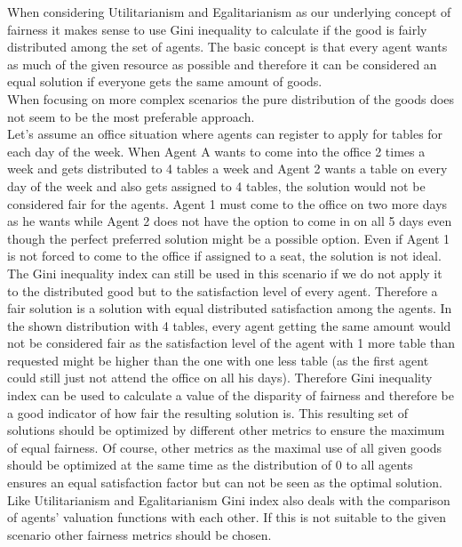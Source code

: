 \documentclass[german, a4paper, 11pt, oneside]{scrbook}
\begin{document}
When considering Utilitarianism and Egalitarianism as our underlying concept of fairness it makes sense to use Gini inequality to calculate if the good is fairly distributed among the set of agents. The basic concept is that every agent wants as much of the given resource as possible and therefore it can be considered an equal solution if everyone gets the same amount of goods. \\When focusing on more complex scenarios the pure distribution of the goods does not seem to be the most preferable approach. \\ Let's assume an office situation where agents can register to apply for tables for each day of the week. When Agent A wants to come into the office 2 times a week and gets distributed to 4 tables a week and Agent 2 wants a table on every day of the week and also gets assigned to 4 tables, the solution would not be considered fair for the agents. Agent 1 must come to the office on two more days as he wants while Agent 2 does not have the option to come in on all 5 days even though the perfect preferred solution might be a possible option. Even if Agent 1 is not forced to come to the office if assigned to a seat, the solution is not ideal. The Gini inequality index can still be used in this scenario if we do not apply it to the distributed good but to the satisfaction level of every agent. Therefore a fair solution is a solution with equal distributed satisfaction among the agents. In the shown distribution with 4 tables, every agent getting the same amount would not be considered fair as the satisfaction level of the agent with 1 more table than requested might be higher than the one with one less table (as the first agent could still just not attend the office on all his days). Therefore Gini inequality index can be used to calculate a value of the disparity of fairness and therefore be a good indicator of how fair the resulting solution is. This resulting set of solutions should be optimized by different other metrics to ensure the maximum of equal fairness. Of course, other metrics as the maximal use of all given goods should be optimized at the same time as the distribution of 0 to all agents ensures an equal satisfaction factor but can not be seen as the optimal solution. Like Utilitarianism and Egalitarianism Gini index also deals with the comparison of agents' valuation functions with each other. If this is not suitable to the given scenario other fairness metrics should be chosen.
\end{document}
